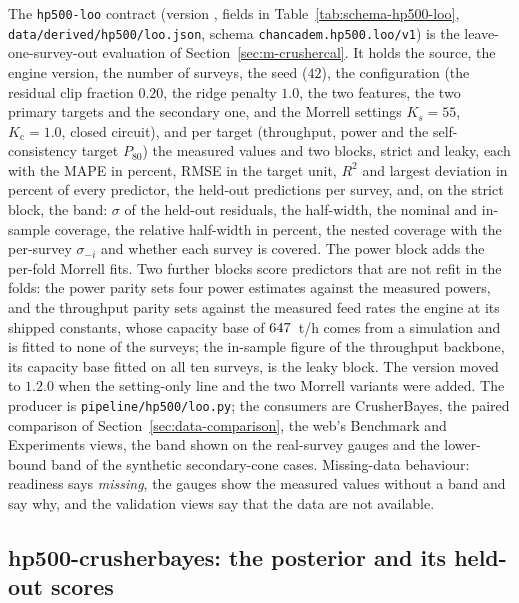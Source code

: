 The \texttt{hp500-loo} contract (version , fields in Table~\ref{tab:schema-hp500-loo}, \texttt{data/\allowbreak{}derived/\allowbreak{}hp500/\allowbreak{}loo.json}, schema \texttt{chancadem.hp500.loo/\allowbreak{}v1})
is the leave-one-survey-out evaluation of Section~\ref{sec:m-crushercal}. It holds the source, the engine version, the number of
surveys, the seed ($42$), the configuration (the residual clip fraction $0.20$, the ridge penalty $1.0$, the two features, the
two primary targets and the secondary one, and the Morrell settings $K_s=55$, $K_{\mathrm c}=1.0$, closed circuit), and per target
(throughput, power and the self-consistency target $P_{80}$) the measured values and two blocks, strict and leaky, each with the
MAPE in percent, RMSE in the target unit, $R^2$ and largest deviation in percent of every predictor, the held-out predictions per
survey, and, on the strict block, the band: $\sigma$ of the held-out residuals, the half-width, the nominal and in-sample
coverage, the relative half-width in percent, the nested coverage with the per-survey $\sigma_{-i}$ and whether each survey is
covered. The power block adds the per-fold Morrell fits. Two further blocks score predictors that are not refit in the folds:
the power parity sets four power estimates against the measured powers, and the throughput parity sets against the measured
feed rates the engine at its shipped constants, whose capacity base of $647$~t/h comes from a simulation and is fitted to none
of the surveys; the in-sample figure of the throughput backbone, its capacity base fitted on all ten surveys, is the leaky block. The
version moved to $1.2.0$ when the setting-only line and the two Morrell variants were added. The producer is
\texttt{pipeline/\allowbreak{}hp500/\allowbreak{}loo.py}; the consumers are CrusherBayes, the paired comparison of Section~\ref{sec:data-comparison}, the web's Benchmark and Experiments views, the band shown on the
real-survey gauges and the lower-bound band of the synthetic secondary-cone cases. Missing-data behaviour: readiness says
\emph{missing}, the gauges show the measured values without a band and say why, and the validation views say that the data are
not available.

\subsection{hp500-crusherbayes: the posterior and its held-out scores}\label{sec:data-cb}

